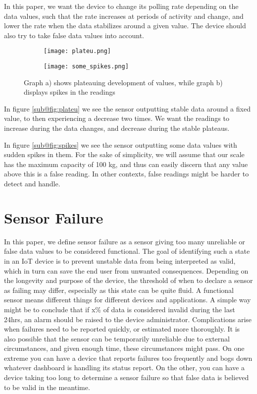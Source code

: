 In this paper, we want the device to change its polling rate depending on the data values, such that the rate increases at periods of activity and change, and lower the rate when the data stabilizes around a given value. The device should also try to take false data values into account.

\begin{figure}[H]
\centering
	\begin{subfigure}[b]{0.3\textwidth}
    \texttt{[image: plateu.png]}
    \caption{}
    \label{fig:plateu}
	\end{subfigure}
	\begin{subfigure}[b]{0.3\textwidth}
    \texttt{[image: some\_spikes.png]}
    \caption{}
    \label{fig:spikes}
	\end{subfigure}
\caption{Graph a) shows plateauing development of values, while graph b) displays spikes in the readings}
\end{figure}

In figure \ref{sub@fig:plateu} we see the sensor outputting stable data around a fixed value, to then experiencing a decrease two times. We want the readings to increase during the data changes, and decrease during the stable plateaus.

In figure \ref{sub@fig:spikes} we see the sensor outputting some data values with sudden spikes in them. For the sake of simplicity, we will assume that our scale has the maximum capacity of 100 kg, and thus can easily discern that any value above this is a false reading. In other contexts, false readings might be harder to detect and handle.

\section{Sensor Failure}
In this paper, we define sensor failure as a sensor giving too many unreliable or false data values to be considered functional. The goal of identifying such a state in an IoT device is to prevent unstable data from being interpreted as valid, which in turn can save the end user from unwanted consequences. Depending on the longevity and purpose of the device, the threshold of when to declare a sensor as failing may differ, especially as this state can be quite fluid. A functional sensor means different things for different devices and applications. A simple way might be to conclude that if x\% of data is considered invalid during the last 24hrs, an alarm should be raised to the device administrator. Complications arise when failures need to be reported quickly, or estimated more thoroughly. It is also possible that the sensor can be temporarily unreliable due to external circumstances, and given enough time, these circumstances might pass. On one extreme you can have a device that reports failures too frequently and bogs down whatever dashboard is handling its status report. On the other, you can have a device taking too long to determine a sensor failure so that false data is believed to be valid in the meantime.

